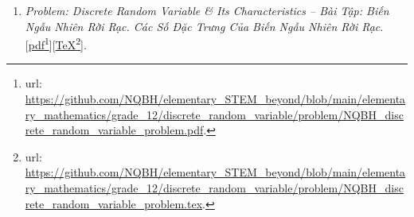 \documentclass[12pt,twoside]{book}
\begin{document}
\begin{enumerate}
	Folder: {\sf Elementary STEM \& Beyond{\tt/}Elementary Mathematics{\tt/}grade 12{\tt/}conditional probability{\tt/}problem}.
	\begin{itemize}
		\item {\it Problem \& Solution: Conditional Probability -- Bài Tập \& Lời Giải: Xác Suất Có Điều Kiện}. [\href{https://github.com/NQBH/elementary_STEM_beyond/blob/main/elementary_mathematics/grade_12/conditional_probability/solution/NQBH_conditional_probability_solution.pdf}{pdf}\footnote{{\sc url}: \url{https://github.com/NQBH/elementary_STEM_beyond/blob/main/elementary_mathematics/grade_12/conditional_probability/solution/NQBH_conditional_probability_solution.pdf}.}][\href{https://github.com/NQBH/elementary_STEM_beyond/blob/main/elementary_mathematics/grade_12/conditional_probability/solution/NQBH_conditional_probability_solution.tex}{\TeX}\footnote{{\sc url}: \url{https://github.com/NQBH/elementary_STEM_beyond/blob/main/elementary_mathematics/grade_12/conditional_probability/solution/NQBH_conditional_probability_solution.tex}.}].
		
		Folder: {\sf Elementary STEM \& Beyond{\tt/}Elementary Mathematics{\tt/}grade 12{\tt/}conditional probability{\tt/}solution}.
	\end{itemize}
	\item {\it Problem: Discrete Random Variable \& Its Characteristics -- Bài Tập: Biến Ngẫu Nhiên Rời Rạc. Các Số Đặc Trưng Của Biến Ngẫu Nhiên Rời Rạc}. [\href{https://github.com/NQBH/elementary_STEM_beyond/blob/main/elementary_mathematics/grade_12/discrete_random_variable/problem/NQBH_discrete_random_variable_problem.pdf}{pdf}\footnote{{\sc url}: \url{https://github.com/NQBH/elementary_STEM_beyond/blob/main/elementary_mathematics/grade_12/discrete_random_variable/problem/NQBH_discrete_random_variable_problem.pdf}.}][\href{https://github.com/NQBH/elementary_STEM_beyond/blob/main/elementary_mathematics/grade_12/discrete_random_variable/problem/NQBH_discrete_random_variable_problem.tex}{\TeX}\footnote{{\sc url}: \url{https://github.com/NQBH/elementary_STEM_beyond/blob/main/elementary_mathematics/grade_12/discrete_random_variable/problem/NQBH_discrete_random_variable_problem.tex}.}].
	

\end{enumerate}
\end{document}
